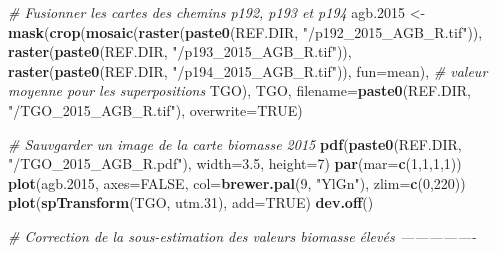 \documentclass[a4paper, notitlepage, 12pt, krantz2]{krantz}
\newenvironment{Shaded}{\begin{snugshade}}{\end{snugshade}}
\newcommand{\CommentTok}[1]{\textcolor[rgb]{0.56,0.35,0.01}{\textit{#1}}}
\newcommand{\DataTypeTok}[1]{\textcolor[rgb]{0.13,0.29,0.53}{#1}}
\newcommand{\DecValTok}[1]{\textcolor[rgb]{0.00,0.00,0.81}{#1}}
\newcommand{\FloatTok}[1]{\textcolor[rgb]{0.00,0.00,0.81}{#1}}
\newcommand{\KeywordTok}[1]{\textcolor[rgb]{0.13,0.29,0.53}{\textbf{#1}}}
\newcommand{\NormalTok}[1]{#1}
\newcommand{\OtherTok}[1]{\textcolor[rgb]{0.56,0.35,0.01}{#1}}
\newcommand{\StringTok}[1]{\textcolor[rgb]{0.31,0.60,0.02}{#1}}
\begin{document}
\begin{Shaded}
\begin{Highlighting}[]
{{{{\CommentTok{# Fusionner les cartes des chemins p192, p193 et p194}
\NormalTok{agb}\FloatTok{.2015}\NormalTok{ <-}\StringTok{ }\KeywordTok{mask}\NormalTok{(}\KeywordTok{crop}\NormalTok{(}\KeywordTok{mosaic}\NormalTok{(}\KeywordTok{raster}\NormalTok{(}\KeywordTok{paste0}\NormalTok{(REF.DIR, }\StringTok{"/p192_2015_AGB_R.tif"}\NormalTok{)),}
                             \KeywordTok{raster}\NormalTok{(}\KeywordTok{paste0}\NormalTok{(REF.DIR, }\StringTok{"/p193_2015_AGB_R.tif"}\NormalTok{)), }
                             \KeywordTok{raster}\NormalTok{(}\KeywordTok{paste0}\NormalTok{(REF.DIR, }\StringTok{"/p194_2015_AGB_R.tif"}\NormalTok{)),}
                             \DataTypeTok{fun=}\NormalTok{mean),  }\CommentTok{# valeur moyenne pour les superpositions}
\NormalTok{                      TGO), }
\NormalTok{                 TGO, }
                 \DataTypeTok{filename=}\KeywordTok{paste0}\NormalTok{(REF.DIR, }\StringTok{"/TGO_2015_AGB_R.tif"}\NormalTok{), }\DataTypeTok{overwrite=}\OtherTok{TRUE}\NormalTok{)}

\CommentTok{# Sauvgarder un image de la carte biomasse 2015}
\KeywordTok{pdf}\NormalTok{(}\KeywordTok{paste0}\NormalTok{(REF.DIR, }\StringTok{"/TGO_2015_AGB_R.pdf"}\NormalTok{),}
    \DataTypeTok{width=}\FloatTok{3.5}\NormalTok{, }\DataTypeTok{height=}\DecValTok{7}\NormalTok{)}
\KeywordTok{par}\NormalTok{(}\DataTypeTok{mar=}\KeywordTok{c}\NormalTok{(}\DecValTok{1}\NormalTok{,}\DecValTok{1}\NormalTok{,}\DecValTok{1}\NormalTok{,}\DecValTok{1}\NormalTok{))}
\KeywordTok{plot}\NormalTok{(agb}\FloatTok{.2015}\NormalTok{, }\DataTypeTok{axes=}\OtherTok{FALSE}\NormalTok{, }\DataTypeTok{col=}\KeywordTok{brewer.pal}\NormalTok{(}\DecValTok{9}\NormalTok{, }\StringTok{"YlGn"}\NormalTok{), }\DataTypeTok{zlim=}\KeywordTok{c}\NormalTok{(}\DecValTok{0}\NormalTok{,}\DecValTok{220}\NormalTok{))}
\KeywordTok{plot}\NormalTok{(}\KeywordTok{spTransform}\NormalTok{(TGO, utm}\FloatTok{.31}\NormalTok{), }\DataTypeTok{add=}\OtherTok{TRUE}\NormalTok{)}
\KeywordTok{dev.off}\NormalTok{()}


\CommentTok{# Correction de la sous-estimation des valeurs biomasse élevés ----------------}

}}}}
\end{Highlighting}
\end{Shaded}
\end{document}
